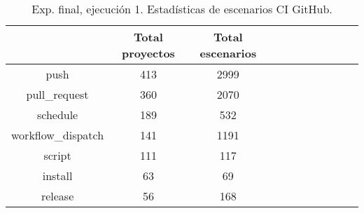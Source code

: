\begin{table}
  \centering
  \caption{Exp. final, ejecución 1. Estadísticas de escenarios CI GitHub.}
  \label{tab:tabla_f1_5}

\begin{footnotesize}
\renewcommand{\arraystretch}{1.5} %
\begin{tabular}{ccccccccccc}
  \hline
  {} &  Total proyectos &  Total escenarios \\
  \hline
  push                        &                 413 &          2999 \\
  pull\_request                &                 360 &          2070 \\
  schedule                    &                 189 &           532 \\
  workflow\_dispatch           &                 141 &          1191 \\
  script                      &                 111 &           117 \\
  install                     &                  63 &            69 \\
  release                     &                  56 &           168 \\

\end{tabular}
\end{footnotesize}
\end{table}
